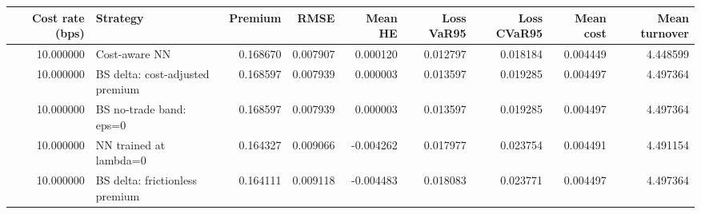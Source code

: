 \begin{tabular}{rlrrrrrrr}
\toprule
Cost rate (bps) & Strategy & Premium & RMSE & Mean HE & Loss VaR95 & Loss CVaR95 & Mean cost & Mean turnover \\
\midrule
10.000000 & Cost-aware NN & 0.168670 & 0.007907 & 0.000120 & 0.012797 & 0.018184 & 0.004449 & 4.448599 \\
10.000000 & BS delta: cost-adjusted premium & 0.168597 & 0.007939 & 0.000003 & 0.013597 & 0.019285 & 0.004497 & 4.497364 \\
10.000000 & BS no-trade band: eps=0 & 0.168597 & 0.007939 & 0.000003 & 0.013597 & 0.019285 & 0.004497 & 4.497364 \\
10.000000 & NN trained at lambda=0 & 0.164327 & 0.009066 & -0.004262 & 0.017977 & 0.023754 & 0.004491 & 4.491154 \\
10.000000 & BS delta: frictionless premium & 0.164111 & 0.009118 & -0.004483 & 0.018083 & 0.023771 & 0.004497 & 4.497364 \\
\bottomrule
\end{tabular}
